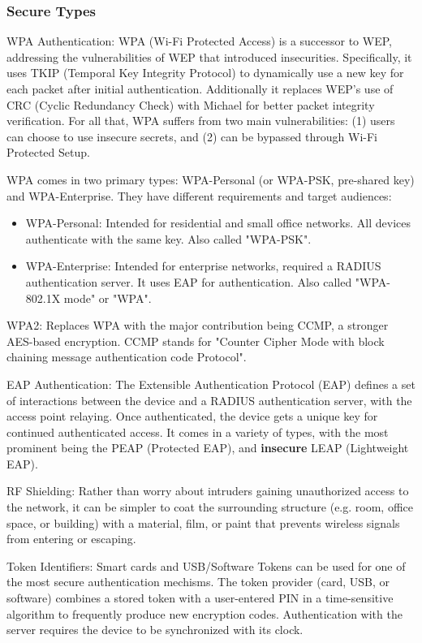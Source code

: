 \subsubsection{Secure Types}
\begin{description}
  \item{WPA Authentication:} WPA (Wi-Fi Protected Access) is a successor to WEP, addressing the
  vulnerabilities of WEP that introduced insecurities. Specifically, it uses TKIP (Temporal Key
  Integrity Protocol) to dynamically use a new key for each packet after initial authentication.
  Additionally it replaces WEP's use of CRC (Cyclic Redundancy Check) with Michael for better packet
  integrity verification. For all that, WPA suffers from two main vulnerabilities: (1) users can
  choose to use insecure secrets, and (2) can be bypassed through Wi-Fi Protected Setup.

  WPA comes in two primary types: WPA-Personal (or WPA-PSK, pre-shared key) and WPA-Enterprise. They
  have different requirements and target audiences: \cite{wiki:WPA}
  \begin{itemize}
  \item{WPA-Personal:} Intended for residential and small office networks. All devices authenticate
  with the same key. Also called "WPA-PSK".
  \item{WPA-Enterprise:} Intended for enterprise networks, required a RADIUS authentication server.
  It uses EAP for authentication. Also called "WPA-802.1X mode" or "WPA".
  \end{itemize}

  \item{WPA2:} Replaces WPA with the major contribution being CCMP, a stronger AES-based encryption.
  CCMP stands for "Counter Cipher Mode with block chaining message authentication code Protocol".

  \item{EAP Authentication:} The Extensible Authentication Protocol (EAP) defines a set of
  interactions between the device and a RADIUS authentication server, with the access point
  relaying. Once authenticated, the device gets a unique key for continued authenticated access. It
  comes in a variety of types, with the most prominent being the PEAP (Protected EAP), and
  \textbf{insecure} LEAP (Lightweight EAP).

  \item{RF Shielding:} Rather than worry about intruders gaining unauthorized access to the network,
  it can be simpler to coat the surrounding structure (e.g. room, office space, or building) with
  a material, film, or paint that prevents wireless signals from entering or escaping.

  \item{Token Identifiers:} Smart cards and USB/Software Tokens can be used for one of the most
  secure authentication mechisms. The token provider (card, USB, or software) combines a stored
  token with a user-entered PIN in a time-sensitive algorithm to frequently produce new encryption
  codes. Authentication with the server requires the device to be synchronized with its clock.
\end{description}


